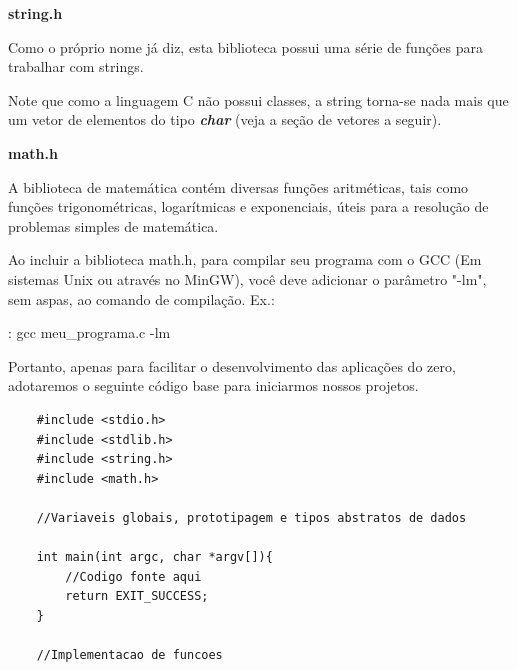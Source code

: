 \documentclass[12pt]{article}
\newcommand\tab[1][1cm]{\hspace*{#1}}
\begin{document}
\par\tab\textbf{string.h}
\par\tab Como o próprio nome já diz, esta biblioteca possui uma série de funções para trabalhar com strings.

\hspace{0.25cm}
\begin{tcolorbox}[colback=green!5!white,colframe=green!75!black,title=Curiosidade]
  \par\tab Note que como a linguagem C não possui classes, a string torna-se nada mais que um vetor de elementos do tipo \textit{\textbf{char}} (veja a seção de vetores a seguir).
\end{tcolorbox}

\par\tab\textbf{math.h}
\par\tab A biblioteca de matemática contém diversas funções aritméticas, tais como funções trigonométricas, logarítmicas e exponenciais, úteis para a resolução de problemas simples de matemática.

\hspace{0.25cm}
\begin{tcolorbox}[colback=yellow!5!white,colframe=yellow!75!black,title=Atenção!]
  \par\tab Ao incluir a biblioteca math.h, para compilar seu programa com o GCC (Em sistemas Unix ou através no MinGW), você deve adicionar o parâmetro "-lm", sem aspas, ao comando de compilação. Ex.:
  
  \par\tab {\$}: gcc meu\_programa.c -lm
\end{tcolorbox}

\par\tab Portanto, apenas para facilitar o desenvolvimento das aplicações do zero, adotaremos o seguinte código base para iniciarmos nossos projetos.

\hspace{0.25cm}
\begin{lstlisting}
    #include <stdio.h>
    #include <stdlib.h>
    #include <string.h>
    #include <math.h>
    
    //Variaveis globais, prototipagem e tipos abstratos de dados
    
    int main(int argc, char *argv[]){
        //Codigo fonte aqui
        return EXIT_SUCCESS;
    }
    
    //Implementacao de funcoes
\end{lstlisting}
\end{document}
